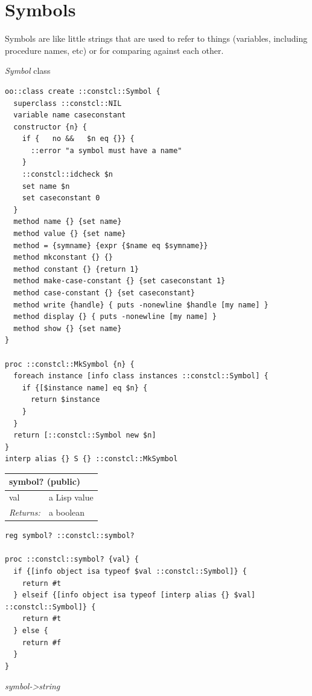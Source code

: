 \documentclass[twoside,9pt]{report}
\begin{document}
\section{Symbols}
\label{symbols}

Symbols are like little strings that are used to refer to things (variables, including procedure names, etc) or for comparing against each other.


\emph{Symbol} class

\noindent\makebox[\linewidth]{\rule{\linewidth}{0.4pt}}
\begin{lstlisting}
oo::class create ::constcl::Symbol {
  superclass ::constcl::NIL
  variable name caseconstant
  constructor {n} {
    if {   no &&   $n eq {}} {
      ::error "a symbol must have a name"
    }
    ::constcl::idcheck $n
    set name $n
    set caseconstant 0
  }
  method name {} {set name}
  method value {} {set name}
  method = {symname} {expr {$name eq $symname}}
  method mkconstant {} {}
  method constant {} {return 1}
  method make-case-constant {} {set caseconstant 1}
  method case-constant {} {set caseconstant}
  method write {handle} { puts -nonewline $handle [my name] }
  method display {} { puts -nonewline [my name] }
  method show {} {set name}
}
 
proc ::constcl::MkSymbol {n} {
  foreach instance [info class instances ::constcl::Symbol] {
    if {[$instance name] eq $n} {
      return $instance
    }
  }
  return [::constcl::Symbol new $n]
}
interp alias {} S {} ::constcl::MkSymbol
\end{lstlisting}
\noindent\makebox[\linewidth]{\rule{\linewidth}{0.4pt}}
\begin{tabular}{ |l l| }
\hline
\multicolumn{2}{|l|}{symbol? (public)} \\
\hline
val & a Lisp value \\
\textit{Returns:} & a boolean \\
\hline
\end{tabular}

\noindent\makebox[\linewidth]{\rule{\linewidth}{0.4pt}}
\begin{lstlisting}
reg symbol? ::constcl::symbol?
 
proc ::constcl::symbol? {val} {
  if {[info object isa typeof $val ::constcl::Symbol]} {
    return #t
  } elseif {[info object isa typeof [interp alias {} $val] ::constcl::Symbol]} {
    return #t
  } else {
    return #f
  }
}
\end{lstlisting}
\noindent\makebox[\linewidth]{\rule{\linewidth}{0.4pt}}

\emph{symbol->string}
\end{document}
